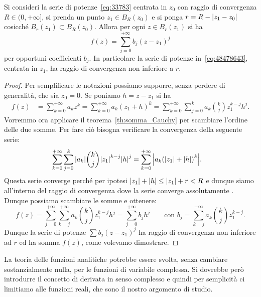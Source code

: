\begin{theorem}
%
%
\label{th:488456367}
Si consideri la serie di potenze~\eqref{eq:33783} centrata in $z_0$
con raggio di convergenza
$R\in (0,+\infty]$, si prenda un punto $z_1 \in B_R(z_0)$
e si ponga $r=R-{\left|z_1-z_0\right|}$ cosicché $B_r(z_1)\subset B_R(z_0)$.
Allora
per ogni $z\in B_r(z_1)$ si ha
\begin{equation}\label{eq:48478643}
  f(z) = \sum_{j=0}^{+\infty} b_j (z - z_1)^j
\end{equation}
per opportuni coefficienti $b_j$. In particolare la serie
di potenze in~\eqref{eq:48478643}, centrata in $z_1$,
ha raggio di convergenza non inferiore a $r$.
\end{theorem}
%
\begin{proof}
Per semplificare le notazioni possiamo supporre, senza perdere di generalità,
che sia $z_0=0$. Se poniamo $h=z-z_1$ si ha
\begin{align*}
f(z) 
&= \sum_{k=0}^{+\infty} a_k z^k 
= \sum_{k=0}^{+\infty} a_k (z_1+h)^k
= \sum_{k=0}^{+\infty} \sum_{j=0}^k a_k {k \choose j}z_1^{k-j}h^j.
\end{align*}
Vorremmo ora applicare il teorema~\ref{th:somma_Cauchy}
per scambiare l'ordine delle due somme.
Per fare ciò bisogna verificare la convergenza
della seguente serie:
\begin{align*}
  \sum_{k=0}^{+\infty} \sum_{j=0}^k {\left|a_k\right|} {k \choose j}{\left|z_1\right|}^{k-j}{\left|h\right|}^j 
  &= \sum_{k=0}^{+\infty} {\left|a_k {\left( {\left|z_1\right|}+{\left|h\right|} \right)}^k\right|}.
\end{align*}
Questa serie converge perché per ipotesi ${\left|z_1\right|}+{\left|h\right|} \le {\left|z_1\right|} + r < R$
e dunque siamo all'interno del raggio di convergenza dove la serie converge
assolutamente . 
Dunque possiamo scambiare le somme e ottenere:
\[
  f(z) = \sum_{j=0}^{+\infty} \sum_{k=j}^{+\infty} a_k {k\choose j} z_1^{k-j} h^j
    = \sum_{j=0}^{+\infty} b_j h^j
  \qquad\text{con }
b_j = \sum_{k=j}^{+\infty}
 a_k {k\choose j}z_1^{k-j}.
\]
Dunque la serie di potenze $\sum b_j (z-z_1)^j$ 
ha raggio di convergenza non inferiore ad $r$ 
ed ha somma $f(z)$, come volevamo dimostrare.
\end{proof}

La teoria delle funzioni analitiche potrebbe essere svolta, senza cambiare
sostanzialmente nulla, per le funzioni di variabile complessa.
Si dovrebbe però introdurre il concetto di derivata in senso complesso
e quindi per semplicità ci limitiamo alle funzioni reali, 
che sono il nostro argomento di studio.

